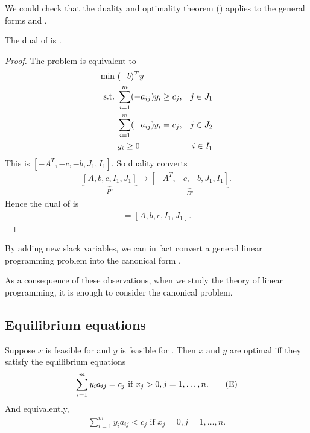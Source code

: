 \begin{remark}
We could check that the duality and optimality theorem () applies to the general forms  and .
\end{remark}

\begin{theorem}
The dual of  is .
\end{theorem}

\begin{proof}
The problem  is equivalent to 
\begin{align}
\min \ & (-b)^T y & \\
\mathrm{s.t. \ }    & \sum_{i=1}^{m} (-a_{ij}) y_i \ge c_j, & j \in J_1 \\
       & \sum_{i=1}^{m} (-a_{ij}) y_i = c_j, & j \in J_2 \\
       & y_i \ge 0 & i \in I_1
\end{align}
This is $[-A^T, -c, -b, J_1, I_1]$. 
So duality converts
\begin{align}
\underbrace{[A, b, c, I_1, J_1]}_{P^o} \to \underbrace{[-A^T, -c, -b, J_1, I_1]}_{D^o}.
\end{align}
Hence the dual of  is
\begin{align}
[-(-A^T)^T, -(-b), -(-c), I_1, J_1] = [A, b, c, I_1, J_1].
\end{align}
\end{proof}

\begin{remark}
By adding new slack variables, we can in fact convert a general linear programming problem  into the canonical form .

As a consequence of these observations, when we study the theory of linear programming, it is enough to consider the canonical problem.
\end{remark}

\subsection{Equilibrium equations}

\begin{theorem}
Suppose $x$ is feasible for  and $y$ is feasible for .
Then $x$ and $y$ are optimal iff they satisfy the equilibrium equations
\begin{align}
\sum_{i=1}^{m} y_i a_{ij} = c_j \text{ if } x_j > 0, j = 1,\dots,n. \tag{E} \labeq{LP_E}
\end{align}
And equivalently,
\begin{align}
\sum_{i=1}^{m} y_i a_{ij} < c_j \text{ if } x_j = 0, j = 1,\dots,n. \tag{E'}
\end{align}
\end{theorem}

